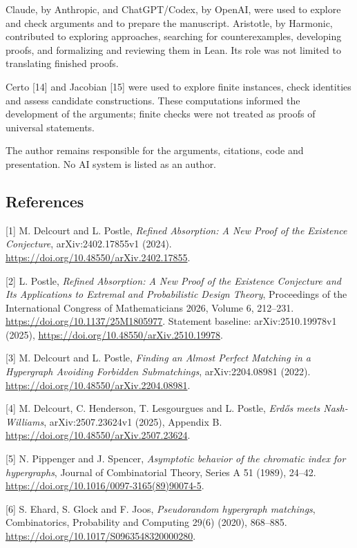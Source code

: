 \documentclass[english,11pt,a4paper]{article}
\begin{document}
Claude, by Anthropic, and ChatGPT/Codex, by OpenAI, were used to explore and check arguments and to prepare the manuscript. Aristotle, by Harmonic, contributed to exploring approaches, searching for counterexamples, developing proofs, and formalizing and reviewing them in Lean. Its role was not limited to translating finished proofs.

Certo {[}14{]} and Jacobian {[}15{]} were used to explore finite instances, check identities and assess candidate constructions. These computations informed the development of the arguments; finite checks were not treated as proofs of universal statements.

The author remains responsible for the arguments, citations, code and presentation. No AI system is listed as an author.

\subsection{References}\label{references}

\begingroup\small\raggedright
\setlength{\parskip}{0pt}

{[}1{]} M. Delcourt and L. Postle, \emph{Refined Absorption: A New Proof of the Existence Conjecture}, arXiv:2402.17855v1 (2024). \url{https://doi.org/10.48550/arXiv.2402.17855}.

{[}2{]} L. Postle, \emph{Refined Absorption: A New Proof of the Existence Conjecture and Its Applications to Extremal and Probabilistic Design Theory}, Proceedings of the International Congress of Mathematicians 2026, Volume 6, 212--231. \url{https://doi.org/10.1137/25M1805977}. Statement baseline: arXiv:2510.19978v1 (2025), \url{https://doi.org/10.48550/arXiv.2510.19978}.

{[}3{]} M. Delcourt and L. Postle, \emph{Finding an Almost Perfect Matching in a Hypergraph Avoiding Forbidden Submatchings}, arXiv:2204.08981 (2022). \url{https://doi.org/10.48550/arXiv.2204.08981}.

{[}4{]} M. Delcourt, C. Henderson, T. Lesgourgues and L. Postle, \emph{Erdős meets Nash-Williams}, arXiv:2507.23624v1 (2025), Appendix B. \url{https://doi.org/10.48550/arXiv.2507.23624}.

{[}5{]} N. Pippenger and J. Spencer, \emph{Asymptotic behavior of the chromatic index for hypergraphs}, Journal of Combinatorial Theory, Series A 51 (1989), 24--42. \url{https://doi.org/10.1016/0097-3165(89)90074-5}.

{[}6{]} S. Ehard, S. Glock and F. Joos, \emph{Pseudorandom hypergraph matchings}, Combinatorics, Probability and Computing 29(6) (2020), 868--885. \url{https://doi.org/10.1017/S0963548320000280}.
\end{document}
